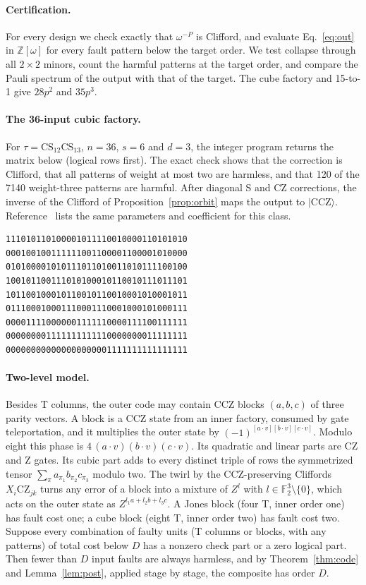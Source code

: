 \documentclass[aps,prl,reprint,twocolumn,amsmath,amssymb,floatfix,nofootinbib,superscriptaddress]{revtex4-2}
\newcommand{\F}{\mathbb F_2}
\newcommand{\CCZ}{\mathrm{CCZ}}
\newcommand{\CS}{\mathrm{CS}}
\begin{document}
\paragraph*{Certification.}
For every design we check exactly that $\omega^{-P}$ is Clifford, and evaluate Eq.~\eqref{eq:out} in $\mathbb Z[\omega]$ for every fault pattern below the target order. We test collapse through all $2\times2$ minors, count the harmful patterns at the target order, and compare the Pauli spectrum of the output with that of the target. The cube factory and 15-to-1 give $28p^2$ and $35p^3$.

\paragraph*{The 36-input cubic factory.}
For $\tau=\CS_{12}\CS_{13}$, $n=36$, $s=6$ and $d=3$, the integer program returns the matrix below (logical rows first). The exact check shows that the correction is Clifford, that all patterns of weight at most two are harmless, and that 120 of the 7140 weight-three patterns are harmful. After diagonal S and CZ corrections, the inverse of the Clifford of Proposition~\ref{prop:orbit} maps the output to $|\CCZ\rangle$. Reference~\cite{wjs} lists the same parameters and coefficient for this class.
{
\begin{verbatim}
111010110100001011110010000110101010
000100100111111001100001100001010000
010100001010111011010011010111100100
100101100111010100010110010111011101
101100100010110010110010001010001011
011100010001110001110001000101000111
000011110000001111110000111100111111
000000001111111111110000000011111111
000000000000000000001111111111111111
\end{verbatim}}

\paragraph*{Two-level model.}
Besides T columns, the outer code may contain CCZ blocks $(a,b,c)$ of three parity vectors. A block is a CCZ state from an inner factory, consumed by gate teleportation, and it multiplies the outer state by $(-1)^{[a\cdot v][b\cdot v][c\cdot v]}$. Modulo eight this phase is $4\,(a\cdot v)(b\cdot v)(c\cdot v)$. Its quadratic and linear parts are CZ and Z gates. Its cubic part adds to every distinct triple of rows the symmetrized tensor $\sum_\pi a_{\pi_1}b_{\pi_2}c_{\pi_3}$ modulo two. The twirl by the CCZ-preserving Cliffords $X_i\mathrm{CZ}_{jk}$ turns any error of a block into a mixture of $Z^l$ with $l\in\F^3\setminus\{0\}$, which acts on the outer state as $Z^{l_1a+l_2b+l_3c}$. A Jones block (four T, inner order one) has fault cost one; a cube block (eight T, inner order two) has fault cost two. Suppose every combination of faulty units (T columns or blocks, with any patterns) of total cost below $D$ has a nonzero check part or a zero logical part. Then fewer than $D$ input faults are always harmless, and by Theorem~\ref{thm:code} and Lemma~\ref{lem:post}, applied stage by stage, the composite has order $D$.
\end{document}
